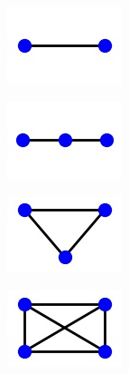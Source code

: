 \begin{figure}
    \begin{center}
        \begin{subfigure}{2.25cm}
            \begin{center}
                \includegraphics{theoretical_study/figures/lattices/_2_site_chain.jpg}                        
            \end{center}
            \caption{}
        \end{subfigure}
        \qquad
        \begin{subfigure}{2.25cm} 
            \begin{center}
                \includegraphics{theoretical_study/figures/lattices/_3_site_chain.jpg}
            \end{center}
            \caption{}
        \end{subfigure}
        \qquad
        \begin{subfigure}{2.25cm} 
            \begin{center}
                \includegraphics{theoretical_study/figures/lattices/_3_site_lattice_fully_connected.jpg}        
            \end{center}
            \caption{}
        \end{subfigure}
        \qquad
        \begin{subfigure}{2.25cm} 
            \begin{center}
                \includegraphics{theoretical_study/figures/lattices/_4_site_lattice_fully_connected.jpg}        

\end{center}
\end{subfigure}
\end{center}
\end{figure}
